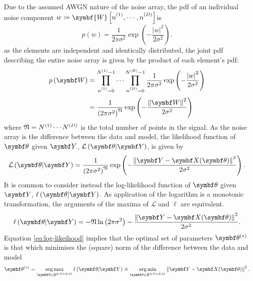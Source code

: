 Due to the assumed \ac{AWGN} nature of the noise array, the \ac{pdf} of an individual noise component
$w \coloneq \symbf{W}\left[\none, \cdots, \nD\right]$is
\begin{equation}
    p(w) =
        \frac{1}{2\pi \sigma^2}
        \exp\left( -\frac{\left\lvert w \right\rvert^2}{2\sigma^2}\right).
\end{equation}
as the elements are independent and identically distributed, the joint \ac{pdf}
describing the entire noise array is given by the product of each element's
\ac{pdf}:
\begin{equation}
    \begin{split}
        p\left(\bW\right) &=
            \prod_{\none=0}^{\None - 1}
            \cdots
            \prod_{\nD=0}^{\ND - 1}
            \frac{1}{2\pi \sigma^2}
            \exp\left(
                -\frac
                {\left\lvert w \right\rvert^2}
                {2\sigma^2}\right) \\
            &= \frac{1}{\left(2\pi \sigma^2\right)^{\mathfrak{N}}}
            \exp\left( -\frac{\left\lVert \bW \right\rVert^2}{2\sigma^2}\right)
    \end{split}
\end{equation}
where $\mathfrak{N} = N^{(1)} \cdots N^{(D)}$ is the total number of points in the
signal. As the noise array is the difference between the data and model, the
likelihood function of $\bth$ given $\bY$, $\mathcal{L}\left(\bth \vert
\bY\right)$, is given by
\begin{equation}
    \mathcal{L}\left(\bth \vert \bY\right) =
    \frac{1}{\left(2\pi \sigma^2\right)^{\mathfrak{N}}}
        \exp\left( -\frac{\left\lVert \bY - \bX(\bth) \right\rVert^2}{2\sigma^2}\right).
\end{equation}
It is common to consider instead the log-likelihood function of $\bth$ given
$\bY$, $\ell\left(\bth \vert \bY\right)$. As application of the logarithm is a
monotonic transformation, the arguments of the maxima of $\mathcal{L}$ and
$\ell$ are equivalent.
\begin{equation}
    \ell\left(\bth \vert \bY\right) =
        -\mathfrak{N} \ln\left(2 \pi \sigma^2\right)
        -\frac{\left\lVert \bY - \bX(\bth) \right\rVert^2}{2\sigma^2}.
    \label{eq:log-likeihood}
\end{equation}
Equation \ref{eq:log-likeihood} implies that the optimal set of parameters
$\bth^{(*)}$
is that which minimises the
(square) norm of the difference between the data and model
\begin{equation}
    \bthstar = \argmax_{\bth \in \mathbb{R}^{2(D+2)M}}
        \ell\left(\bth \vert \bY\right) \equiv
        \argmin_{\bth \in \mathbb{R}^{2(D+2)M}} \left\lVert \bY - \bX(\bth) \right\rVert^2.
    \label{eq:argmin_y-x}
\end{equation}
